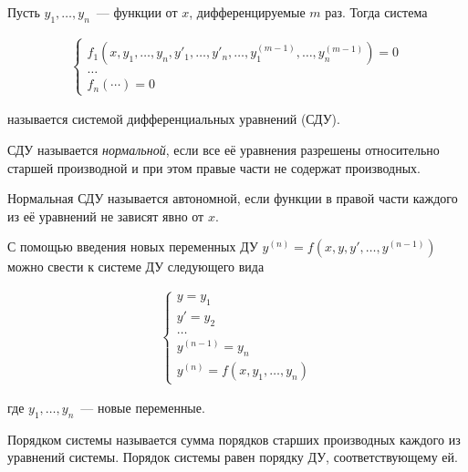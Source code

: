 
\begin{definition}
  Пусть \(y_{1}, \dots, y_{n}\)~--- функции от \(x\), дифференцируемые \(m\)
  раз. Тогда система

  \begin{align*}
    \begin{cases}
      f_{1}(x,
        y_{1}, \dotsc, y_{n},
        y'_{1}, \dotsc, y'_{n},
        \dotsc,
        y_{1}^{(m - 1)}, \dotsc, y_{n}^{(m - 1)}
      ) = 0 \\
      \dotsc \\
      f_{n} (\cdots) = 0
    \end{cases}
  \end{align*}

  называется системой дифференциальных уравнений (СДУ).
\end{definition}

\begin{definition}
  СДУ называется \textit{нормальной}, если все её уравнения разрешены
  относительно старшей производной и при этом правые части не содержат
  производных.
\end{definition}

\begin{definition}
  Нормальная СДУ называется автономной, если функции в правой части каждого из
  её уравнений не зависят явно от \(x\).
\end{definition}

\begin{remark}\label{de-to-sde}
  С помощью введения новых переменных ДУ
  \(y^{(n)} = f(x, y, y', \dotsc, y^{(n - 1)})\) можно свести к системе ДУ
  следующего вида

  \begin{align*}
    \begin{cases}
      y = y_{1} \\
      y' = y_{2} \\
      \dots \\
      y^{(n - 1)} = y_{n} \\
      y^{(n)} = f(x, y_{1}, \dotsc, y_{n})
    \end{cases}
  \end{align*}

  где \(y_{1}, \dotsc, y_{n}\)~--- новые переменные.
\end{remark}

\begin{definition}
  Порядком системы называется сумма порядков старших производных каждого из
  уравнений системы. Порядок системы равен порядку ДУ, соответствующему ей.
\end{definition}

